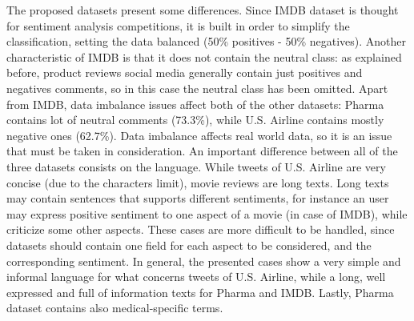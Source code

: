 The proposed datasets present some differences. 
Since IMDB dataset is thought for sentiment analysis competitions, it is built in order to simplify the classification, setting the data balanced (50\% positives - 50\% negatives). Another characteristic of IMDB is that it does not contain the neutral class: as explained before, product reviews social media generally contain just positives and negatives comments, so in this case the neutral class has been omitted. 
Apart from IMDB, data imbalance issues affect both of the other datasets: Pharma contains lot of neutral comments (73.3\%), while U.S. Airline contains  mostly negative ones (62.7\%). Data imbalance affects real world data, so it is an issue that must be taken in consideration.
An important difference between all of the three datasets consists on the language. While tweets of U.S. Airline are very concise (due to the characters limit), movie reviews are long texts. Long texts may contain sentences that supports different sentiments, for instance an user may express positive sentiment to one aspect of a movie (in case of IMDB), while criticize some other aspects. These cases are more difficult to be handled, since datasets should contain one field for each aspect to be considered, and the corresponding sentiment. In general, the presented cases show a very simple and informal language for what concerns tweets of U.S. Airline, while a long, well expressed and full of information texts for Pharma and IMDB. Lastly, Pharma dataset contains also medical-specific terms.



